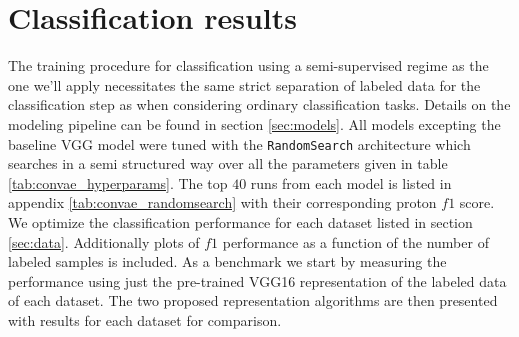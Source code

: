 \chapter{Classification results}

The training procedure for classification using a semi-supervised regime as the one we'll apply necessitates the same strict separation of labeled data for the classification step as when considering ordinary classification tasks. Details on the modeling pipeline can be found in section \ref{sec:models}. All models excepting the baseline VGG model were tuned with the \lstinline{RandomSearch} architecture which searches in a semi structured way over all the parameters given in table \ref{tab:convae_hyperparams}. The top $40$ runs from each model is listed in appendix \ref{tab:convae_randomsearch} with their corresponding proton $f1$ score. We optimize the classification performance for each dataset listed in section \ref{sec:data}. Additionally plots of $f1$ performance as a function of the number of labeled samples is included. As a benchmark we start by measuring the performance using just the pre-trained VGG16 representation of the labeled data of each dataset. The two proposed representation algorithms are then presented with results for each dataset for comparison. 
